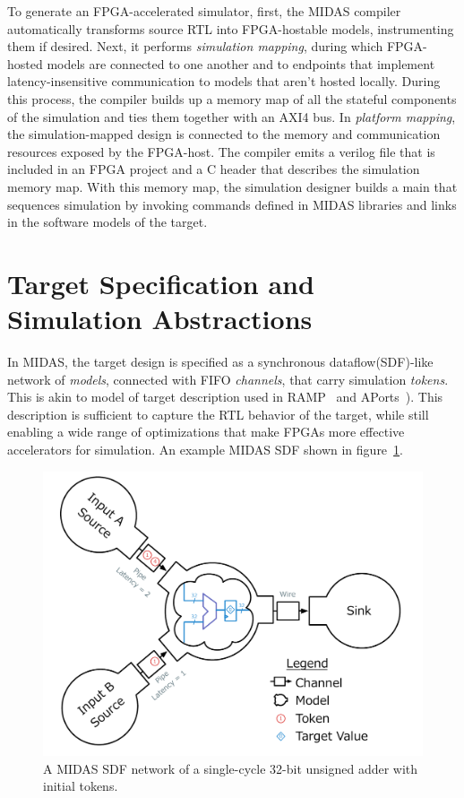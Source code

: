 To generate an FPGA-accelerated simulator, first, the MIDAS compiler
automatically transforms source RTL into FPGA-hostable models,
instrumenting them if desired. Next, it performs \emph{simulation mapping},
during which FPGA-hosted models are connected to one another and to
endpoints that implement latency-insensitive communication to models that
aren't hosted locally. During this process, the compiler builds up a memory map
of all the stateful components of the simulation and ties them together with an
AXI4 bus. In \emph{platform mapping}, the simulation-mapped design is connected
to the memory and communication resources exposed by the FPGA-host. The
compiler emits a verilog file that is included in an FPGA project and a C
header that describes the simulation memory map.  With this memory map, the
simulation designer builds a main that sequences simulation by invoking
commands defined in MIDAS libraries and links in the software models of the
target.

\section{Target Specification and Simulation Abstractions}\label{sec:sdf}

In MIDAS, the target design is specified as a synchronous dataflow(SDF)-like
network of \emph{models}, connected with FIFO \emph{channels}, that carry
simulation \emph{tokens}. This is akin to model of target description used in
RAMP~\cite{ramp} and APorts~\cite{APortNetworks}). This description is sufficient
to capture the RTL behavior of the target, while still enabling a wide range of
optimizations that make FPGAs more effective accelerators for simulation. An
example MIDAS SDF shown in figure~\ref{fig:adder-example}.

\begin{figure}
	\centering
	\includegraphics[width=16cm]{figures/adder-example.pdf}
    \caption{A MIDAS SDF network of a single-cycle 32-bit unsigned adder with initial tokens.}
	\label{fig:adder-example}
\end{figure}

